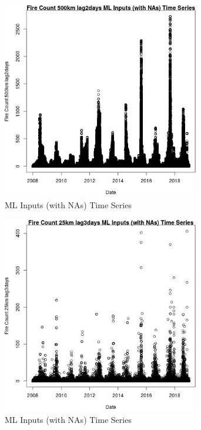 \begin{figure} 
\centering  
\includegraphics[width=0.77\textwidth]{Code_Outputs/Report_ML_input_PM25_Step4_part_f_de_duplicated_aveswNAs_Fire_Count_500km_lag2daysvDate.jpg} 
\caption{\label{fig:Report_ML_input_PM25_Step4_part_f_de_duplicated_aveswNAsFire_Count_500km_lag2daysvDate}ML Inputs (with NAs) Time Series} 
\end{figure} 
 

\clearpage 

\begin{figure} 
\centering  
\includegraphics[width=0.77\textwidth]{Code_Outputs/Report_ML_input_PM25_Step4_part_f_de_duplicated_aveswNAs_Fire_Count_25km_lag3daysvDate.jpg} 
\caption{\label{fig:Report_ML_input_PM25_Step4_part_f_de_duplicated_aveswNAsFire_Count_25km_lag3daysvDate}ML Inputs (with NAs) Time Series} 
\end{figure} 
 

